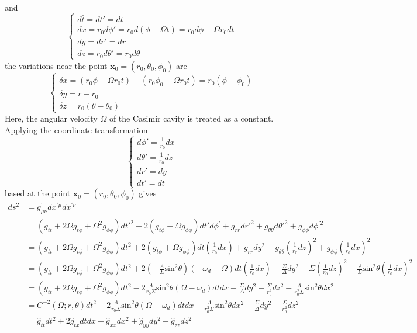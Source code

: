 \documentclass[english]{article}
\begin{document}
 and 
\[
\begin{cases}
d\bar{t}=dt'=dt\\
dx=r_{0}d\phi'=r_{0}d\left(\phi-\Omega t\right)=r_{0}d\phi-\Omega r_{0}dt\\
dy=dr'=dr\\
dz=r_{0}d\theta'=r_{0}d\theta
\end{cases}
\]
 the variations near the point $\boldsymbol{x}_{0}=\left(r_{0},\theta_{0},\phi_{0}\right)$
are 
\[
\begin{cases}
\delta x=\left(r_{0}\phi-\Omega r_{0}t\right)-\left(r_{0}\phi_{0}-\Omega r_{0}t\right)=r_{0}\left(\phi-\phi_{0}\right)\\
\delta y=r-r_{0}\\
\delta z=r_{0}\left(\theta-\theta_{0}\right)
\end{cases}
\]
 Here, the angular velocity $\Omega$ of the Casimir cavity is treated
as a constant. Applying the coordinate transformation 
\[
\begin{cases}
d\phi'=\frac{1}{r_{0}}dx\\
d\theta'=\frac{1}{r_{0}}dz\\
dr'=dy\\
dt'=dt
\end{cases}
\]
 based at the point $\boldsymbol{x}_{0}=\left(r_{0},\theta_{0},\phi_{0}\right)$
gives 
\begin{align*}
ds^{2} & =g^{'}_{\mu\nu}dx^{'\mu}dx^{'\nu}\\
 & =\left(g_{tt}+2\Omega g_{t\phi}+\Omega^{2}g_{\phi\phi}\right)dt'^{2}+2\left(g_{t\phi}+\Omega g_{\phi\phi}\right)dt'd\phi^{'}+g_{rr}dr'^{2}+g_{\theta\theta}d\theta'^{2}+g_{\phi\phi}d\phi^{'2}\\
 & =\left(g_{tt}+2\Omega g_{t\phi}+\Omega^{2}g_{\phi\phi}\right)dt^{2}+2\left(g_{t\phi}+\Omega g_{\phi\phi}\right)dt\left(\frac{1}{r_{0}}dx\right)+g_{rr}dy^{2}+g_{\theta\theta}\left(\frac{1}{r_{0}}dz\right)^{2}+g_{\phi\phi}\left(\frac{1}{r_{0}}dx\right)^{2}\\
 & =\left(g_{tt}+2\Omega g_{t\phi}+\Omega^{2}g_{\phi\phi}\right)dt^{2}+2\left(-\frac{A}{\Sigma}\text{sin}^{2}\theta\right)\left(-\omega_{d}+\Omega\right)dt\left(\frac{1}{r_{0}}dx\right)-\frac{\Sigma}{\Delta}dy^{2}-\Sigma\left(\frac{1}{r_{0}}dz\right)^{2}-\frac{A}{\Sigma}\text{sin}^{2}\theta\left(\frac{1}{r_{0}}dx\right)^{2}\\
 & =\left(g_{tt}+2\Omega g_{t\phi}+\Omega^{2}g_{\phi\phi}\right)dt^{2}-2\frac{A}{r_{0}\Sigma}\text{sin}^{2}\theta\left(\Omega-\omega_{d}\right)dtdx-\frac{\Sigma}{\Delta}dy^{2}-\frac{\Sigma}{r^{2}_{0}}dz^{2}-\frac{A}{r^{2}_{0}\Sigma}\text{sin}^{2}\theta dx^{2}\\
 & =C^{-2}\left(\Omega;r,\theta\right)dt^{2}-2\frac{A}{r_{0}\Sigma}\text{sin}^{2}\theta\left(\Omega-\omega_{d}\right)dtdx-\frac{A}{r^{2}_{0}\Sigma}\text{sin}^{2}\theta dx^{2}-\frac{\Sigma}{\Delta}dy^{2}-\frac{\Sigma}{r^{2}_{0}}dz^{2}\\
 & =\hat{g}_{tt}dt^{2}+2\hat{g}_{tx}dtdx+\hat{g}_{xx}dx^{2}+\hat{g}_{yy}dy^{2}+\hat{g}_{zz}dz^{2}
\end{align*}
\end{document}
